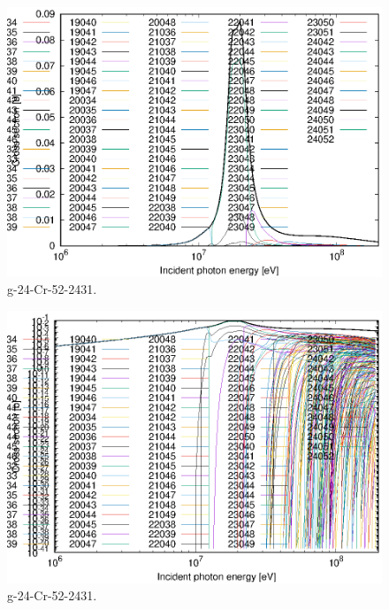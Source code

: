 \begin{figure}
 \includegraphics[width=\linewidth]{eps/g_24-Cr-52_2431.eps}
  \caption{g-24-Cr-52-2431.}
\end{figure}
\begin{figure}
 \includegraphics[width=\linewidth]{eps-log/g_24-Cr-52_2431.eps}
 \caption{g-24-Cr-52-2431.}
\end{figure}
\newpage \clearpage

